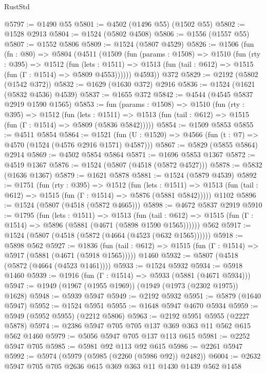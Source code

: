 \begin{lexlean}{RustStd}
\begin{coremodule}
@5797 := @1490 @55
@5801 := @4502 (@1496 @55) (@1502 @55)
@5802 := @1528 @2913
@5804 := @1524 (@5802 @4508)
@5806 := @1556 (@1557 @55)
@5807 := @1552 @5806
@5809 := @1524 (@5807 @4529)
@5826 := @1506
    (fun (fn : @80) =>
    @5804
      (@4511
        (@1509
          (fun (params : @1508) =>
          @1510
            (fun (rty : @395) =>
            @1512
              (fun (lets : @1511) =>
              @1513 (fun (tail : @612) => @1515 (fun (Γ : @1514) => @5809 @4553))))))
        @4593))
    @372
@5829 := @2192 (@5802 (@1542 @372))
@5832 := @1629 (@1630 @372) @2916
@5836 := @1524 (@1621 (@5832 @4536) @4539)
@5837 := @1655 @372
@5842 := @4544 (@4545 @5837 @2919 @1590 @1565)
@5853 := fun (params : @1508) =>
  @1510
    (fun (rty : @395) =>
    @1512
      (fun (lets : @1511) =>
      @1513 (fun (tail : @612) => @1515 (fun (Γ : @1514) => @5809 (@5836 @5842)))))
@5854 := @1509 @5853
@5855 := @4511 @5854
@5864 := @1521 (fun (U : @1520) => @4566 (fun (t : @7) => @4570 (@1524 (@4576 @2916 @1571) @4587)))
@5867 := @5829 (@5855 @5864) @2914
@5869 := @4502 @5854 @5864
@5871 := @1696 @5853 @1367
@5872 := @4519 @1367
@5876 := @1524 (@5807 (@4518 (@5872 @4527)))
@5878 := @5832 (@1636 @1367)
@5879 := @1621 @5878
@5881 := @1524 (@5879 @4539)
@5892 := @1751
    (fun (rty : @395) =>
    @1512
      (fun (lets : @1511) =>
      @1513 (fun (tail : @612) => @1515 (fun (Γ : @1514) => @5876 (@5881 @5842)))))
    @1102
@5896 := @1524 (@5807 (@4518 (@5872 @4665)))
@5898 := @4672 @5837 @2919
@5910 := @1795
    (fun (lets : @1511) =>
    @1513
      (fun (tail : @612) => @1515 (fun (Γ : @1514) => @5896 (@5881 (@4671 (@5898 @1590 @1565))))))
    @562
@5917 := @1524 (@5807 (@4518 (@5872 (@4664 (@4523 (@632 @1565))))))
@5918 := @5898 @562
@5927 := @1836
    (fun (tail : @612) => @1515 (fun (Γ : @1514) => @5917 (@5881 (@4671 (@5918 @1565)))))
    @1460
@5932 := @5807 (@4518 (@5872 (@4664 (@4523 @1461))))
@5933 := @1524 @5932
@5934 := @5918 @1460
@5939 := @1916 (fun (Γ : @1514) => @5933 (@5881 (@4671 @5934)))
@5947 := @1949 (@1967 (@1955 @1969)) (@1949 (@1973 (@2302 @1975)) @1628)
@5948 := @5939 @5947
@5949 := @2192 @5932
@5951 := @5879 (@1640 @5947)
@5952 := @1524 @5951
@5955 := @1648 @5947 @4670 @5934
@5959 := @5949 (@5952 @5955) (@2212 @5806)
@5963 := @2192 @5951 @5955 (@2227 @5878)
@5974 := @2386 @5947 @705 @705 @137 @369 @363 @11 @562 @615 @562 @1460
@5979 := @5056 @5947 @705 @137 @113 @615
@5981 := @2252 @5947 @705
@5985 := @5981 @92 @113 @92 @615
@5986 := @2261 @5947
@5992 := @5974 (@5979 (@5985 (@2260 (@5986 @92)) @2482))
@6004 := @2632 @5947 @705 @705 @2636 @615 @369 @363 @11 @1430 @1439 @562 @1458

\end{coremodule}
\end{lexlean}

